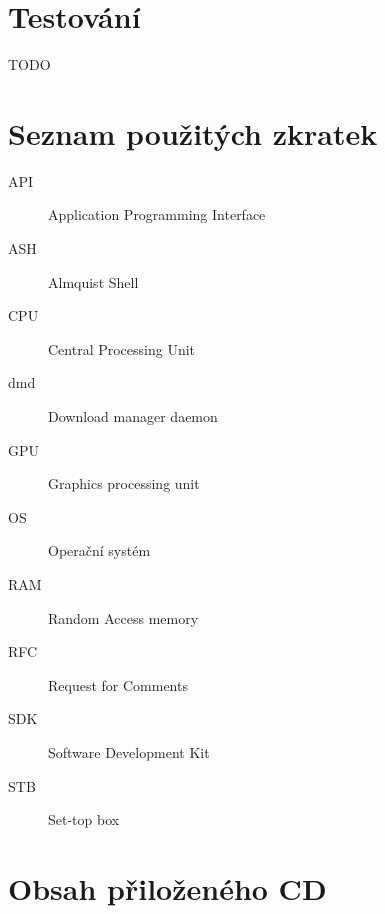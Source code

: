 \documentclass[thesis=B,czech]{FITthesis}[2012/06/26]
\begin{document}
\chapter{Testování}
TODO

\begin{conclusion}

\end{conclusion}




\appendix

\chapter{Seznam použitých zkratek}
\begin{description}
	\item[API] Application Programming Interface
	\item[ASH] Almquist Shell
	\item[CPU] Central Processing Unit
	\item[dmd] Download manager daemon
	\item[GPU] Graphics processing unit
	\item[OS] Operační systém
	\item[RAM] Random Access memory
	\item[RFC] Request for Comments
	\item[SDK] Software Development Kit
	\item[STB] Set-top box
\end{description}

\chapter{Obsah přiloženého CD}

\begin{figure}
\end{figure}
\end{document}
